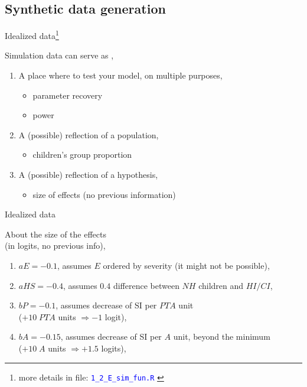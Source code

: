 \subsection{Synthetic data generation}
%
%
\begin{frame}[t, negative]
	\subsectionpage
\end{frame}
%
%
\begin{lhframe}[rhgraphic={\texttt{[image: sim\_code1.png]}}]
	{Idealized data\footnote{more details in file: \textcolor{blue}{\texttt{1\_2\_E\_sim\_fun.R} }}}
	
	Simulation data can serve as \cite{Kruschke_2014, McElreath_2020},
	\begin{enumerate}
		\item A place where to test your model, on multiple purposes,
		\begin{itemize}
			\item parameter recovery
			\item power
		\end{itemize}
		\item A (possible) reflection of a population, 
		\begin{itemize}
			\item children's group proportion \cite{DeRaeve_2016}
		\end{itemize}
		\item A (possible) reflection of a hypothesis,
		\begin{itemize}
			\item size of effects \alert{(no previous information)}
		\end{itemize}
	\end{enumerate}
\end{lhframe}
%
%
\begin{lhframe}[rhgraphic={\texttt{[image: sim\_code1.png]}}]
	{Idealized data}
	
	About the size of the effects \\
	\alert{(in logits, no previous info)},
	\begin{enumerate}
		\item $aE=-0.1$, assumes $E$ ordered by severity \alert{(it might not be possible)},
		\item $aHS=-0.4$, assumes $0.4$ difference between $NH$ children and $HI/CI$,
		\item $bP=-0.1$, assumes decrease of SI per $PTA$ unit \\
		($+10 \; PTA$ units $\Rightarrow -1$ logit),
		\item $bA=-0.15$, assumes decrease of SI per $A$ unit, beyond the minimum \\
		($+10 \; A$ units $\Rightarrow +1.5$ logits),
	\end{enumerate}
\end{lhframe}
